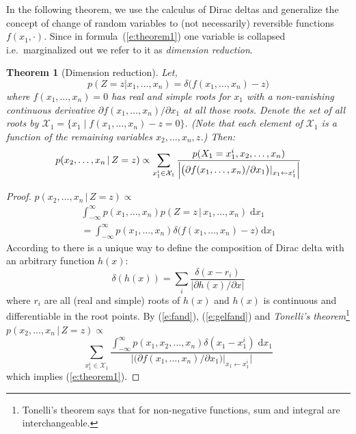 \documentclass[letterpaper]{article}
\newtheorem{theorem}{Theorem}
\newcommand{\pr}{p}
\newcommand{\dd}{\;\mathrm{d}} %
\begin{document}
In the following theorem, we use the calculus of Dirac deltas and generalize the concept of change of random variables to (not necessarily) reversible functions $f(x_1, \cdot)$.
Since in formula~(\ref{e:theorem1}) one variable is collapsed i.e.\ marginalized out we refer to it as \emph{dimension reduction}. 

\begin{theorem}[Dimension reduction] 
\label{theorem1}
Let, 
\[ 
\pr(Z\!=\!z | x_1, \ldots, x_n) = \delta \big( f(x_1, \ldots, x_n)-z \big)
\]
where $f(x_1, \ldots, x_n) = 0$ has real and simple roots for $x_1$ with a non-vanishing continuous derivative
$\partial f(x_1, \ldots, x_n) / \partial x_1$ at all those roots.
Denote the set of all roots by 
 $ \mathcal{X}_1 = \{ x_1 \; | \; f(x_1, \ldots, x_n) - z = 0 \} $. 
(Note that each element of $ \mathcal{X}_1 $
 is a function of the remaining variables $ x_2,\dots,x_n,z $.)
 Then:
\begin{equation}\footnotesize
\label{e:theorem1}
p(x_2, \ldots, x_n \,|\, Z=z) \propto 
\sum_{x_1^i \in \mathcal{X}_1} 
\frac{p(X_1=x_1^i, x_2, \ldots, x_n)}
{\Big|\big(\partial f(x_1, \ldots, x_n) / \partial x_1 \big)|_{x_1 \leftarrow x_1^i} \Big|}
\end{equation}
\end{theorem}
\begin{proof} 
{\footnotesize
$p(x_2, \ldots, x_n \,|\, Z=z) \propto$
\begin{multline}
\int_{-\infty}^{\infty}p(x_1, \ldots, x_n)p(Z=z \,|\, x_1, \ldots, x_n) \dd x_1 %
%
\\=\int_{-\infty}^{\infty}p(x_1, \ldots, x_n)
\delta \big( f(x_1, \ldots, x_n) - z \big) \dd x_1 
\label{e:fand}
\end{multline}
}
According to \cite{gel1964generalized}
there is a unique way to define the composition of Dirac delta with 
an arbitrary function $h(x)$:
\begin{equation}
\label{e:gelfand}
\delta(h(x)) = \sum_{i} \frac{\delta(x - r_i)}{|\partial h(x)/\partial x|}
\end{equation}
where $r_i$ are all (real and simple) roots of $h(x)$ and $h(x)$ is continuous and differentiable in the root points. By (\ref{e:fand}), (\ref{e:gelfand})  and 
\emph{Tonelli's theorem}\footnote{Tonelli's theorem says that for non-negative functions, sum and integral are interchangeable.} 
$\pr(x_2, \ldots, x_n \,|\, Z = z) \propto$
\begin{equation*}%
\sum_{x_1^i \in \mathcal{X}_1} 
\frac{\int_{-\infty}^{\infty} p(x_1, x_2, \ldots, x_n)  \delta(x_1 - x_1^i) \dd x_1}
{\Big|\big(\partial f(x_1, \ldots, x_n) / \partial x_1 \big)|_{x_1 \leftarrow x_1^i} \Big|}
\end{equation*}
which implies (\ref{e:theorem1}).
\end{proof}
%
\end{document}
